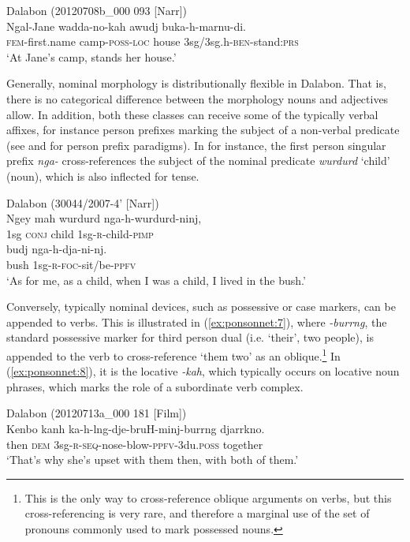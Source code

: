 \documentclass[output=paper]{langscibook}
\begin{document}
\ea
{\label{ex:ponsonnet:5} Dalabon (20120708b\_000 093 [Narr])}\\
\gll Ngal-Jane wadda-no-kah awudj buka-h-marnu-di.\\
\textsc{fem}-first.name camp-\textsc{poss-loc} 
house  3sg/3sg.h-\textsc{ben-}stand:\textsc{prs}\\
\glt ‘At Jane’s camp, stands her house.’
\z 

Generally, nominal morphology is distributionally flexible in Dalabon. That is, there is no categorical difference between the morphology nouns and adjectives allow. In addition, both these classes can receive some of the typically verbal affixes, for instance person prefixes marking the subject of a non-verbal predicate (see \citealt{EvansEvans2001} and \citealt{EvansEvans2004} for person prefix paradigms). In  for instance, the first person singular prefix \textit{nga-} cross-references the subject of the nominal predicate \textit{wurdurd} ‘child’ (noun), which is also inflected for tense.

 
\ea
{ \label{ex:ponsonnet:6}Dalabon (30044/2007-4’ [Narr])}\\
\gll Ngey   mah   wurdurd   nga-h-wurdurd-ninj, \\
1sg   \textsc{conj}  child     1sg-\textsc{r}{}-child-\textsc{pimp}\\
\gll budj   nga-h-dja-ni-nj.\\
bush   1sg-\textsc{r}{}-\textsc{foc}{}-sit/be-\textsc{ppfv}\\
\glt ‘As for me, as a child, when I was a child, I lived in the bush.’
\z 

Conversely, typically nominal devices, such as possessive or case markers, can be appended to verbs. This is illustrated in (\ref{ex:ponsonnet:7}), where \textit{{}-burrng}, the standard possessive marker for third person dual (i.e. ‘their’, two people), is appended to the verb to cross-reference ‘them two’ as an oblique.\footnote{This is the only way to cross-reference oblique arguments on verbs, but this cross-referencing is very rare, and therefore a marginal use of the set of pronouns commonly used to mark possessed nouns.}  In (\ref{ex:ponsonnet:8}), it is the locative \textit{{}-kah}, which typically occurs on locative noun phrases, which marks the role of a subordinate verb complex.
 
\ea
{\label{ex:ponsonnet:7}Dalabon (20120713a\_000 181 [Film])}\\
\gll Kenbo kanh ka-h-lng-dje-bruH-minj-burrng        djarrkno.\\
then     \textsc{dem} 3sg-\textsc{r-seq}{}-nose-blow-\textsc{ppfv}{}-3du.\textsc{poss} together\\
\glt ‘That’s why she’s upset with them then, with both of them.’
\z 
\end{document}
